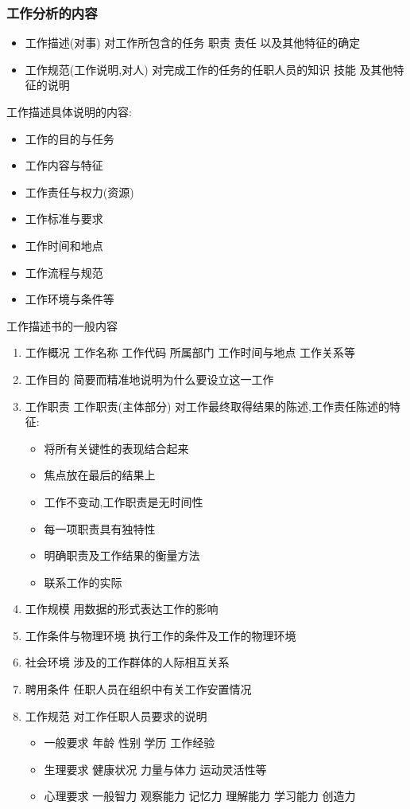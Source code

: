 \documentclass{ctexart}
\begin{document}
\subsubsection{工作分析的内容}
\label{sec-1-2-1}
\begin{itemize}
\item 工作描述(对事) 对工作所包含的任务 职责 责任 以及其他特征的确定
\item 工作规范(工作说明,对人) 对完成工作的任务的任职人员的知识 技能 及其他特征的说明
\end{itemize}
工作描述具体说明的内容:
\begin{itemize}
\item 工作的目的与任务
\item 工作内容与特征
\item 工作责任与权力(资源)
\item 工作标准与要求
\item 工作时间和地点
\item 工作流程与规范
\item 工作环境与条件等
\end{itemize}
工作描述书的一般内容
\begin{enumerate}
\item 工作概况
\label{sec-1-2-1-1}
工作名称 工作代码 所属部门 工作时间与地点 工作关系等
\item 工作目的
\label{sec-1-2-1-2}
简要而精准地说明为什么要设立这一工作
\item 工作职责
\label{sec-1-2-1-3}
工作职责(主体部分)
对工作最终取得结果的陈述,工作责任陈述的特征:
\begin{itemize}
\item 将所有关键性的表现结合起来
\item 焦点放在最后的结果上
\item 工作不变动,工作职责是无时间性
\item 每一项职责具有独特性
\item 明确职责及工作结果的衡量方法
\item 联系工作的实际
\end{itemize}
\item 工作规模
\label{sec-1-2-1-4}
用数据的形式表达工作的影响
\item 工作条件与物理环境
\label{sec-1-2-1-5}
执行工作的条件及工作的物理环境
\item 社会环境
\label{sec-1-2-1-6}
涉及的工作群体的人际相互关系
\item 聘用条件
\label{sec-1-2-1-7}
任职人员在组织中有关工作安置情况
\item 工作规范
\label{sec-1-2-1-8}
对工作任职人员要求的说明
\begin{itemize}
\item 一般要求 年龄 性别 学历 工作经验
\item 生理要求 健康状况 力量与体力 运动灵活性等
\item 心理要求 一般智力 观察能力 记忆力 理解能力 学习能力 创造力
\end{itemize}
\end{enumerate}
\end{document}
